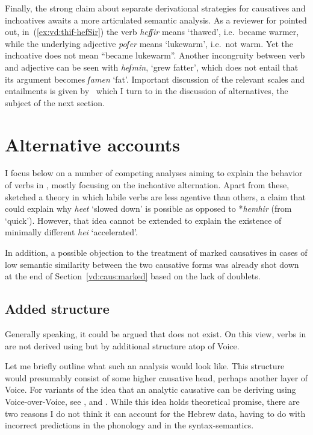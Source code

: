 Finally, the strong claim about separate derivational strategies for causatives and inchoatives awaits a more articulated semantic analysis. As a reviewer for \cite{kastner18tlr} pointed out, in~(\ref{ex:vd:thif-hefSir}) the verb \emph{hefʃir} means `thawed', i.e.~became warmer, while the underlying adjective \emph{poʃer} means `lukewarm', i.e.~not warm. Yet the inchoative does not mean ``became lukewarm''. Another incongruity between verb and adjective can be seen with \emph{heʃmin}, `grew fatter', which does not entail that its argument becomes \emph{ʃamen} `fat'. Important discussion of the relevant scales and entailments is given by~\cite{borer91} which I turn to in the discussion of alternatives, the subject of the next section.

\section{Alternative accounts} \label{vd:others}
I focus below on a number of competing analyses aiming to explain the behavior of verbs in {\thif}, mostly focusing on the inchoative alternation. Apart from these, \cite{lev16} sketched a theory in which labile verbs are less agentive than others, a claim that could explain why \emph{heet} `slowed down' is possible as opposed to *\emph{hemhir} (from `quick'). However, that idea cannot be extended to explain the existence of minimally different \emph{hei{\texttslig}} `accelerated'. 

In addition, a possible objection to the treatment of marked causatives in cases of low semantic similarity between the two causative forms was already shot down at the end of Section~\ref{vd:caus:marked} based on the lack of doublets.
	
	\subsection{Added structure} \label{vd:others:struct}
Generally speaking, it could be argued that {\vd} does not exist. On this view, verbs in {\thif} are not derived using {\vd} but by additional structure atop of Voice.

Let me briefly outline what such an analysis would look like. This structure would presumably consist of some higher causative head, perhaps another layer of Voice. For variants of the idea that an analytic causative can be deriving using Voice-over-Voice, see \citep{tubinoblanco11},\cite{harley13lingua,harley17oup} and \cite{nie17}. While this idea holds theoretical promise, there are two reasons I do not think it can account for the Hebrew data, having to do with incorrect predictions in the phonology and in the syntax-semantics.

